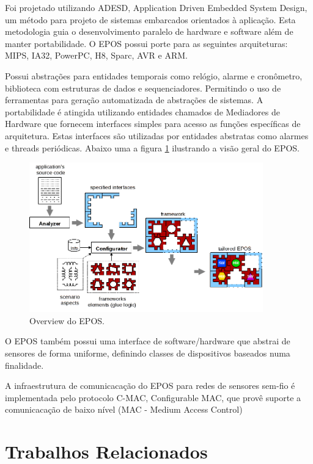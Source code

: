 Foi projetado utilizando ADESD, Application Driven Embedded System Design, um m\'etodo para projeto de sistemas embarcados orientados \`a aplica\c{c}\~ao. Esta metodologia guia o desenvolvimento paralelo de hardware e software al\'em de manter portabilidade. O EPOS possui porte para as seguintes arquiteturas: MIPS, IA32, PowerPC, H8, Sparc, AVR e ARM. \cite{eposProject}

Possui abstra\c{c}\~oes para entidades temporais como rel\'ogio, alarme e cron\^ometro, biblioteca com estruturas de dados e sequenciadores. Permitindo o uso de ferramentas para gera\c{c}\~ao automatizada de abstra\c{c}\~oes de sistemas. A portabilidade \'e atingida utilizando entidades chamados de Mediadores de Hardware que fornecem interfaces simples para acesso as fun\c{c}\~oes espec\'ificas de arquitetura. Estas interfaces s\~ao utilizadas por entidades abstratas como alarmes e threads peri\'odicas. Abaixo uma a figura \ref{eposOverview} ilustrando a vis\~ao geral do EPOS.

\begin{figure}[h]
   \label{eposOverview}
   \centering
   \includegraphics[width=0.9\textwidth]{figuras/eposOverview.png}
   \caption{Overview do EPOS.}
\end{figure}

 
O EPOS tamb\'em possui uma interface de software/hardware que abstrai de sensores de forma uniforme, definindo classes de dispositivos baseados numa finalidade.\cite{epos}

A infraestrutura de comunicaca\c{c}\~ao do EPOS para redes de sensores sem-fio \'e implementada pelo protocolo C-MAC, Configurable MAC, que prov\^e suporte a comunicaca\c{c}\~ao de baixo n\'ivel (MAC - Medium Access Control)

\section{Trabalhos Relacionados}


